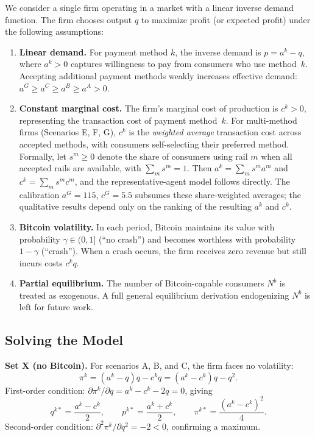 \documentclass{article}
\begin{document}
We consider a single firm operating in a market with a linear inverse demand
function.
The firm chooses output $q$ to maximize profit (or expected profit) under the
following assumptions:

\begin{enumerate}
  \item \textbf{Linear demand.}
        For payment method $k$, the inverse demand is $p = a^k - q$, where
        $a^k > 0$ captures willingness to pay from consumers who use method~$k$.
        Accepting additional payment methods weakly increases effective demand:
        $a^G \geq a^C \geq a^B \geq a^A > 0$.
  \item \textbf{Constant marginal cost.}
        The firm's marginal cost of production is $c^k > 0$, representing the
        transaction cost of payment method~$k$.
        For multi-method firms (Scenarios E, F, G), $c^k$ is the
        \emph{weighted average} transaction cost across accepted methods, with
        consumers self-selecting their preferred method.
        Formally, let $s^m \geq 0$ denote the share of consumers using rail $m$
        when all accepted rails are available, with $\sum_m s^m = 1$.
        Then $a^k = \sum_m s^m a^m$ and $c^k = \sum_m s^m c^m$, and the
        representative-agent model follows directly.
        The calibration $a^G = 115$, $c^G = 5.5$ subsumes these share-weighted
        averages; the qualitative results depend only on the ranking of the
        resulting $a^k$ and $c^k$.
  \item \textbf{Bitcoin volatility.}
        In each period, Bitcoin maintains its value with probability $\gamma \in (0,1]$
        (``no crash'') and becomes worthless with probability $1-\gamma$ (``crash'').
        When a crash occurs, the firm receives zero revenue but still incurs
        costs $c^k q$.
  \item \textbf{Partial equilibrium.}
        The number of Bitcoin-capable consumers $N^b$ is treated as exogenous.
        A full general equilibrium derivation endogenizing $N^b$ is left for
        future work.
\end{enumerate}

\subsection{Solving the Model}
\label{sec:solving}

\textbf{Set X (no Bitcoin).}
For scenarios A, B, and C, the firm faces no volatility:
\begin{equation}
  \pi^k = (a^k - q)q - c^k q = (a^k - c^k)q - q^2.
  \label{eq:setX_profit}
\end{equation}
First-order condition: $\partial \pi^k / \partial q = a^k - c^k - 2q = 0$,
giving
\begin{equation}
  q^{k*} = \frac{a^k - c^k}{2}, \qquad
  p^{k*} = \frac{a^k + c^k}{2}, \qquad
  \pi^{k*} = \frac{(a^k - c^k)^2}{4}.
  \label{eq:setX_eq}
\end{equation}
Second-order condition: $\partial^2 \pi^k / \partial q^2 = -2 < 0$, confirming
a maximum.
\end{document}
